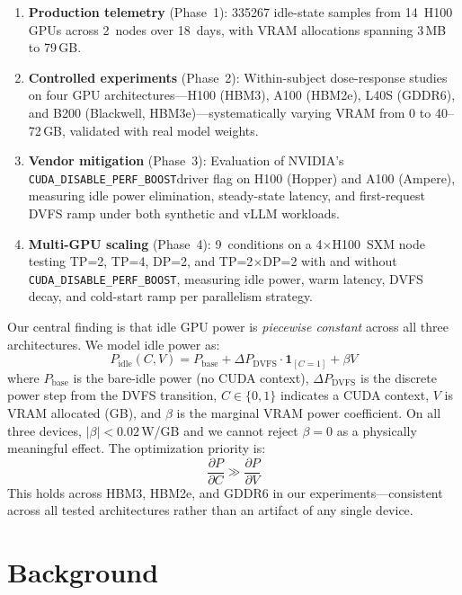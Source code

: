 \documentclass[sigconf,nonacm]{acmart}
\newcommand{\perfboost}{\texttt{CUDA\_\hspace{0pt}DISABLE\_\hspace{0pt}PERF\_\hspace{0pt}BOOST}}
\begin{document}
\begin{enumerate}
    \item \textbf{Production telemetry} (Phase~1): \num{335267} idle-state samples from 14~H100 GPUs across 2~nodes over 18~days, with VRAM allocations spanning 3\,MB to 79\,GB.
    \item \textbf{Controlled experiments} (Phase~2): Within-subject dose-response studies on four GPU architectures---H100 (HBM3), A100 (HBM2e), L40S (GDDR6), and B200 (Blackwell, HBM3e)---systematically varying VRAM from 0 to 40--72\,GB, validated with real model weights.
    \item \textbf{Vendor mitigation} (Phase~3): Evaluation of NVIDIA's \perfboost driver flag on H100 (Hopper) and A100 (Ampere), measuring idle power elimination, steady-state latency, and first-request DVFS ramp under both synthetic and vLLM workloads.
    \item \textbf{Multi-GPU scaling} (Phase~4): 9~conditions on a 4$\times$H100~SXM node testing TP=2, TP=4, DP=2, and TP=2$\times$DP=2 with and without \perfboost, measuring idle power, warm latency, DVFS decay, and cold-start ramp per parallelism strategy.
\end{enumerate}

Our central finding is that idle GPU power is \emph{piecewise constant} across all three architectures. We model idle power as:
\begin{equation}
    P_{\text{idle}}(C, V) = P_{\text{base}} + \Delta P_{\text{DVFS}} \cdot \mathbf{1}_{[C=1]} + \beta V
    \label{eq:model}
\end{equation}
where $P_{\text{base}}$ is the bare-idle power (no CUDA context), $\Delta P_{\text{DVFS}}$ is the discrete power step from the DVFS transition, $C \in \{0,1\}$ indicates a CUDA context, $V$ is VRAM allocated (GB), and $\beta$ is the marginal VRAM power coefficient. On all three devices, $|\beta| < 0.02$\,W/GB and we cannot reject $\beta = 0$ as a physically meaningful effect. The optimization priority is:
\begin{equation}
    \frac{\partial P}{\partial C} \gg \frac{\partial P}{\partial V}
    \label{eq:priority}
\end{equation}
This holds across HBM3, HBM2e, and GDDR6 in our experiments---consistent across all tested architectures rather than an artifact of any single device.

\section{Background}
\end{document}
